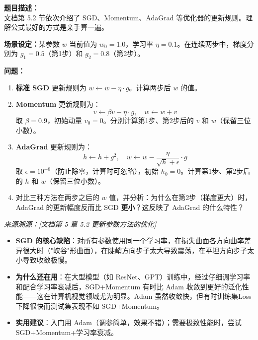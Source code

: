 \documentclass[a4paper,11pt]{ctexart}
\begin{document}
\begin{problembox}
    \textbf{题目描述：}\\
    文档第 5.2 节依次介绍了 SGD、Momentum、AdaGrad 等优化器的更新规则。理解公式最好的方式是亲手算一遍。

    \vspace{0.3cm}
    \textbf{场景设定：}某参数 $w$ 当前值为 $w_0 = 1.0$，学习率 $\eta = 0.1$。在连续两步中，梯度分别为 $g_1 = 0.5$（第1步）和 $g_2 = 0.8$（第2步）。

    \vspace{0.3cm}
    \textbf{问题：}
    \begin{enumerate}[(1)]
        \item \textbf{标准 SGD} 更新规则为 $w \leftarrow w - \eta \cdot g$。计算两步后 $w$ 的值。

        \item \textbf{Momentum} 更新规则为：
        \[
        v \leftarrow \beta v - \eta \cdot g, \quad w \leftarrow w + v
        \]
        取 $\beta = 0.9$，初始动量 $v_0 = 0$。分别计算第1步、第2步后的 $v$ 和 $w$（保留三位小数）。

        \item \textbf{AdaGrad} 更新规则为：
        \[
        h \leftarrow h + g^2, \quad w \leftarrow w - \frac{\eta}{\sqrt{h} + \epsilon} \cdot g
        \]
        取 $\epsilon = 10^{-8}$（防止除零，计算时可忽略），初始 $h_0 = 0$。计算第1步、第2步后的 $h$ 和 $w$（保留三位小数）。

        \item 对比三种方法在两步之后的 $w$ 值，并分析：为什么在第2步（梯度更大）时，AdaGrad 的更新幅度反而比 SGD \textbf{更小}？这反映了 AdaGrad 的什么特性？
    \end{enumerate}

    \vspace{0.2cm}
    {\color{gray}\small\textit{来源溯源：[文档第 5 章 5.2 更新参数方法的优化]}}
\end{problembox}

\begin{beginnerbox}
    \begin{itemize}
        \item \textbf{SGD 的核心缺陷}：对所有参数使用同一个学习率，在损失曲面各方向曲率差异很大时（"峡谷"形曲面），在陡峭方向步子太大导致震荡，在平坦方向步子太小导致收敛极慢。
        \item \textbf{为什么还在用}：在大型模型（如 ResNet、GPT）训练中，经过仔细调学习率和配合学习率衰减后，SGD+Momentum 有时比 Adam 收敛到更好的泛化性能——这在计算机视觉领域尤为明显。Adam 虽然收敛快，但有时训练集Loss 下降很快而测试集表现不如 SGD+Momentum。
        \item \textbf{实用建议}：入门用 Adam（调参简单，效果不错）；需要极致性能时，尝试 SGD+Momentum+学习率衰减。
    \end{itemize}
\end{beginnerbox}
\end{document}
